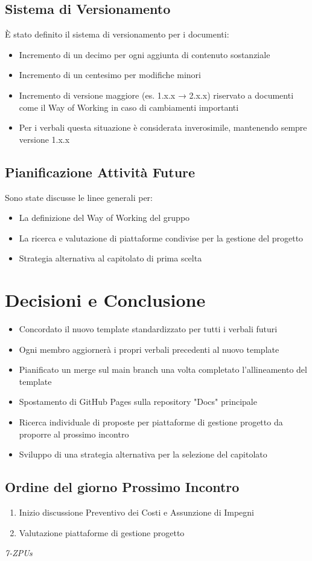 \documentclass[a4paper,12pt]{article}
\begin{document}
\subsection{Sistema di Versionamento}
È stato definito il sistema di versionamento per i documenti:
\begin{itemize}
    \item Incremento di un decimo per ogni aggiunta di contenuto sostanziale
    \item Incremento di un centesimo per modifiche minori
    \item Incremento di versione maggiore (es. 1.x.x → 2.x.x) riservato a documenti come il Way of Working in caso di cambiamenti importanti
    \item Per i verbali questa situazione è considerata inverosimile, mantenendo sempre versione 1.x.x
\end{itemize}

\subsection{Pianificazione Attività Future}
Sono state discusse le linee generali per:
\begin{itemize}
    \item La definizione del Way of Working del gruppo
    \item La ricerca e valutazione di piattaforme condivise per la gestione del progetto
    \item Strategia alternativa al capitolato di prima scelta
\end{itemize}

\vspace{0.5cm}
\section{Decisioni e Conclusione}
\begin{itemize}
    \item Concordato il nuovo template standardizzato per tutti i verbali futuri
    \item Ogni membro aggiornerà i propri verbali precedenti al nuovo template
    \item Pianificato un merge sul main branch una volta completato l'allineamento del template
    \item Spostamento di GitHub Pages sulla repository "Docs" principale
    \item Ricerca individuale di proposte per piattaforme di gestione progetto da proporre al prossimo incontro
    \item Sviluppo di una strategia alternativa per la selezione del capitolato
\end{itemize}

\subsection{Ordine del giorno Prossimo Incontro}
\begin{enumerate}
    \item Inizio discussione Preventivo dei Costi e Assunzione di Impegni
    \item Valutazione piattaforme di gestione progetto
\end{enumerate}

\vfill
\begin{flushright}
    \textit{7-ZPUs}
\end{flushright}
\end{document}

